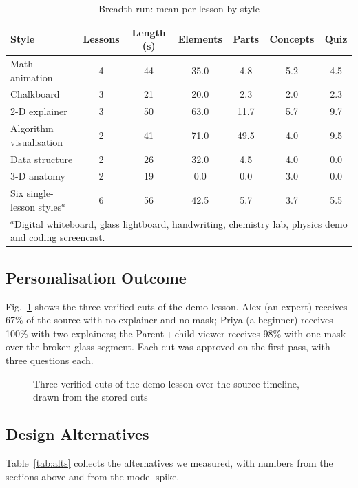 \documentclass[9pt,a4paper]{extarticle}
\newcommand{\fig}[1]{Fig.~\ref{#1}}
\newcommand{\tab}[1]{Table~\ref{#1}}
\begin{document}
\begin{table}[t]
\caption{Breadth run: mean per lesson by style}
\label{tab:breadth}
\centering
\begin{tabular}{|l|c|c|c|c|c|c|}
\hline
Style & Lessons & Length (s) & Elements & Parts & Concepts & Quiz\\
\hline
Math animation & 4 & 44 & 35.0 & 4.8 & 5.2 & 4.5\\
Chalkboard & 3 & 21 & 20.0 & 2.3 & 2.0 & 2.3\\
2-D explainer & 3 & 50 & 63.0 & 11.7 & 5.7 & 9.7\\
Algorithm visualisation & 2 & 41 & 71.0 & 49.5 & 4.0 & 9.5\\
Data structure & 2 & 26 & 32.0 & 4.5 & 4.0 & 0.0\\
3-D anatomy & 2 & 19 & 0.0 & 0.0 & 3.0 & 0.0\\
Six single-lesson styles$^{a}$ & 6 & 56 & 42.5 & 5.7 & 3.7 & 5.5\\
\hline
\multicolumn{7}{|l|}{\footnotesize $^{a}$Digital whiteboard, glass lightboard, handwriting, chemistry lab, physics demo and coding screencast.}\\
\hline
\end{tabular}
\end{table}

\subsection{Personalisation Outcome}
\fig{fig:cuts} shows the three verified cuts of the demo lesson. Alex (an expert) receives 67\% of the source with no
explainer and no mask; Priya (a beginner) receives 100\% with two explainers; the Parent\,+\,child viewer receives 98\%
with one mask over the broken-glass segment. Each cut was approved on the first pass, with three questions each.

\begin{figure}[t]
\centering

\caption{Three verified cuts of the demo lesson over the source timeline, drawn from the stored cuts}
\label{fig:cuts}
\end{figure}

\subsection{Design Alternatives}
\tab{tab:alts} collects the alternatives we measured, with numbers from the sections above and from the model spike.
\end{document}
